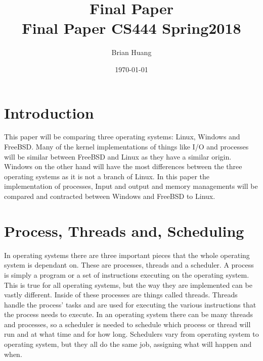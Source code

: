 \documentclass[onecolumn, draftclsnofoot, 10pt, titlepage, compsoc]{IEEEtran}
\title
{%
	Final Paper \\
	\vspace{0.4cm}
	\large Final Paper
	\vspace{0.4cm}
	\large CS444 Spring2018
}
\author{Brian Huang}
\date{\today}
\begin{document}
\maketitle

\section{Introduction}
This paper will be comparing three operating systems: Linux, Windows and FreeBSD. Many of the kernel implementations of things like I/O and processes will be similar between FreeBSD and Linux as they have a similar origin. Windows on the other hand will have the most differences between the three operating systems as it is not a branch of Linux. In this paper the implementation of processes, Input and output and memory managements will be compared and contracted between Windows and FreeBSD to Linux.

\section{Process, Threads and, Scheduling}
In operating systems there are three important pieces that the whole operating system is dependant on. These are processes, threads and a scheduler. A process is simply a program or a set of instructions executing on the operating system. This is true for all operating systems, but the way they are implemented can be vastly different. Inside of these processes are things called threads. Threads handle the process’ tasks and are used for executing the various instructions that the process needs to execute. In an operating system there can be many threads and processes, so a scheduler is needed to schedule which process or thread will run and at what time and for how long. Schedulers vary from operating system to operating system, but they all do the same job, assigning what will happen and when.
\end{document}

